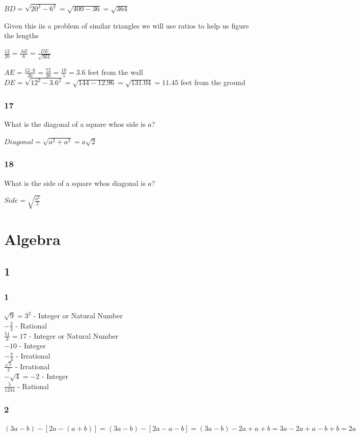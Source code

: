 \documentclass[]{report}
\begin{document}
$BD = \sqrt{20^2 - 6^2} = \sqrt{400 - 36} = \sqrt{364}$

Given this iis a problem of similar triangles we will use ratios to help us figure the lengths

$\frac{12}{20} = \frac{AE}{6} = \frac{DE}{\sqrt{364}}$

$AE = \frac{12 \cdot 6}{20} = \frac{72}{20} = \frac{18}{5} = 3.6$ feet from the wall
$DE = \sqrt{12^2 -  3.6^2} = \sqrt{144 - 12.96} = \sqrt{131.04} = 11.45$ feet from the ground

\subsubsection{17}
What is the diagonal of a square whos side is $a$?

$Diagonal = \sqrt{a^2 + a^2} = a\sqrt{2}$

\subsubsection{18}
What is the side of a square whos diagonal is $a$?

$Side = \sqrt{\frac{a^2}{2}}$
\section{Algebra}

\subsection{1}

\subsubsection{1}
$\sqrt{9} = 3^2$ - Integer or Natural Number\\
$-\frac{2}{3}$ - Rational \\
$ \frac{51}{3} = 17 $ - Integer or Natural Number \\
$ -10 $ - Integer \\
$ -\frac{\pi}{3} $ - Irrational \\
$ \frac{\sqrt{5}}{2} $ - Irrational \\
$ - \sqrt{4} = -2 $ - Integer \\
$ \frac{5}{1234} $ - Rational 

\subsubsection{2}
$ (3a - b)  - [2a - (a + b)] = (3a - b) - [2a - a - b] = (3a - b) - 2a + a + b = 3a - 2a + a - b + b = 2a $ \\
\end{document}
